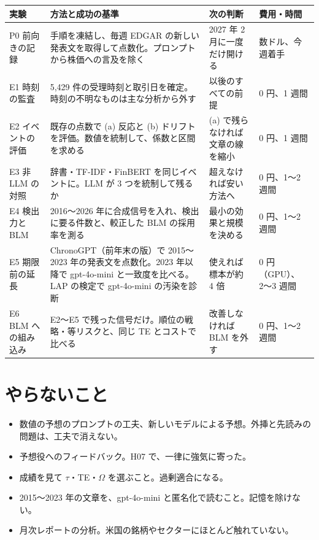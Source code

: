 \documentclass[xelatex,ja=standard,jafont=haranoaji,a4paper,10pt]{bxjsarticle}
\begin{document}
\begin{center}\small
\begin{tabularx}{\linewidth}{@{}p{24mm} L p{30mm} p{18mm}@{}}
\toprule
実験 & 方法と成功の基準 & 次の判断 & 費用・時間 \\
\midrule
P0 前向きの記録 & 手順を凍結し、毎週 EDGAR の新しい発表文を取得して点数化。プロンプトから株価への言及を除く & 2027 年 2 月に一度だけ開ける & 数ドル、今週着手 \\
E1 時刻の監査 & 5,429 件の受理時刻と取引日を確定。時刻の不明なものは主な分析から外す & 以後のすべての前提 & 0 円、1 週間 \\
E2 イベントの評価 & 既存の点数で (a) 反応と (b) ドリフトを評価。数値を統制して、係数と区間を求める & (a) で残らなければ文章の線を縮小 & 0 円、1 週間 \\
E3 非 LLM の対照 & 辞書・TF-IDF・FinBERT を同じイベントに。LLM が 3 つを統制して残るか & 超えなければ安い方法へ & 0 円、1〜2 週間 \\
E4 検出力と BLM & 2016〜2026 年に合成信号を入れ、検出に要る件数と、較正した BLM の採用率を測る & 最小の効果と規模を決める & 0 円、1〜2 週間 \\
E5 期限前の延長 & ChronoGPT（前年末の版）で 2015〜2023 年の発表文を点数化。2023 年以降で gpt-4o-mini と一致度を比べる。LAP の検定で gpt-4o-mini の汚染を診断 & 使えれば標本が約 4 倍 & 0 円（GPU）、2〜3 週間 \\
E6 BLM への組み込み & E2〜E5 で残った信号だけ。順位の戦略・等リスクと、同じ TE とコストで比べる & 改善しなければ BLM を外す & 0 円、1〜2 週間 \\
\bottomrule
\end{tabularx}
\end{center}

\section{やらないこと}
\begin{itemize}
\item 数値の予想のプロンプトの工夫、新しいモデルによる予想。外挿と先読みの問題は、工夫で消えない。
\item 予想役へのフィードバック。H07 で、一律に強気に寄った。
\item 成績を見て $\tau$・TE・$\Omega$ を選ぶこと。過剰適合になる。
\item 2015〜2023 年の文章を、gpt-4o-mini と匿名化で読むこと。記憶を除けない。
\item 月次レポートの分析。米国の銘柄やセクターにほとんど触れていない。
\end{itemize}
\end{document}
